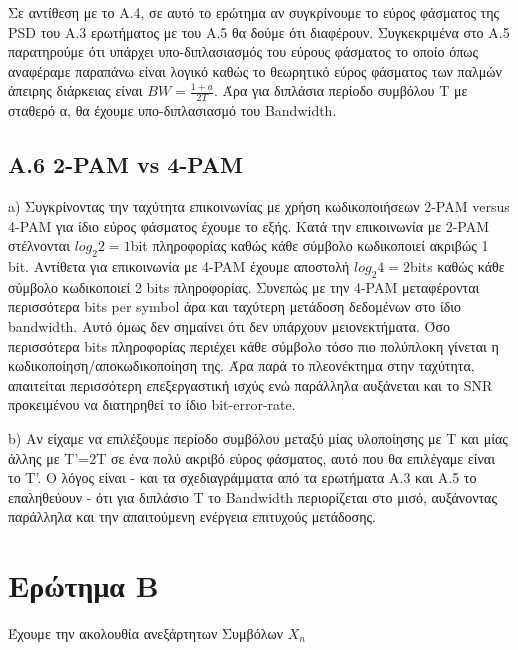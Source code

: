 \documentclass[11pt]{article}
\begin{document}
    
    \par \noindent
    Σε αντίθεση με το Α.4, σε αυτό το ερώτημα αν συγκρίνουμε το εύρος φάσματος της PSD του Α.3 ερωτήματος με του Α.5 θα δούμε ότι διαφέρουν. 
    Συγκεκριμένα στο Α.5 παρατηρούμε ότι υπάρχει υπο-διπλασιασμός του εύρους φάσματος το οποίο όπως αναφέραμε παραπάνω είναι λογικό καθώς το θεωρητικό εύρος φάσματος των παλμών άπειρης διάρκειας είναι $BW=\frac{1+a}{2T}$. Άρα για διπλάσια περίοδο συμβόλου Τ με σταθερό α, θα έχουμε υπο-διπλασιασμό του Bandwidth.
    
    \subsection*{A.6 2-PAM vs 4-PAM}
    a) Συγκρίνοντας την ταχύτητα επικοινωνίας με χρήση κωδικοποιήσεων 2-PAM versus 4-PAM για ίδιο εύρος φάσματος έχουμε το εξής. 
    Κατά την επικοινωνία με 2-PAM στέλνονται $log_2 2=1$bit πληροφορίας καθώς κάθε σύμβολο κωδικοποιεί ακριβώς 1 bit.
    Αντίθετα για επικοινωνία με 4-PAM έχουμε αποστολή $log_2 4 =2$bits καθώς κάθε σύμβολο κωδικοποιεί 2 bits πληροφορίας.
    Συνεπώς με την 4-PAM μεταφέρονται περισσότερα bits per symbol άρα και ταχύτερη μετάδοση δεδομένων στο ίδιο bandwidth. 
    Αυτό όμως δεν σημαίνει ότι δεν υπάρχουν μειονεκτήματα.
    Όσο περισσότερα bits πληροφορίας περιέχει κάθε σύμβολο τόσο πιο πολύπλοκη γίνεται η κωδικοποίηση/αποκωδικοποίηση της.
    Άρα παρά το πλεονέκτημα στην ταχύτητα, απαιτείται περισσότερη επεξεργαστική ισχύς ενώ παράλληλα αυξάνεται και το SNR προκειμένου να διατηρηθεί το ίδιο bit-error-rate. 
    
    \par \noindent
    b) Αν είχαμε να επιλέξουμε περίοδο συμβόλου μεταξύ μίας υλοποίησης με Τ και μίας άλλης με Τ'=2Τ σε ένα πολύ ακριβό εύρος φάσματος, αυτό που θα επιλέγαμε είναι το Τ'. 
    Ο λόγος είναι - και τα σχεδιαγράμματα από τα ερωτήματα Α.3 και Α.5 το επαληθεύουν - ότι για διπλάσιο Τ το Bandwidth περιορίζεται στο μισό, αυξάνοντας παράλληλα και την απαιτούμενη ενέργεια επιτυχούς μετάδοσης.
    
    
    
    \section*{Ερώτημα B}
    Έχουμε την ακολουθία ανεξάρτητων Συμβόλων $X_n$
    
\end{document}
